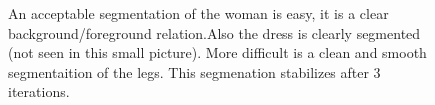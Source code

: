 \documentclass[11pt,a4paper]{article}
\begin{document}
\begin{figure}
\centering
{}
\quad
{}

\caption{An acceptable segmentation of the woman is easy, it is a clear background/foreground relation.Also the dress is clearly segmented (not seen in this small picture). More difficult is a clean and smooth segmentaition of the legs. This segmenation stabilizes after 3 iterations.}%

\end{figure}
\end{document}
